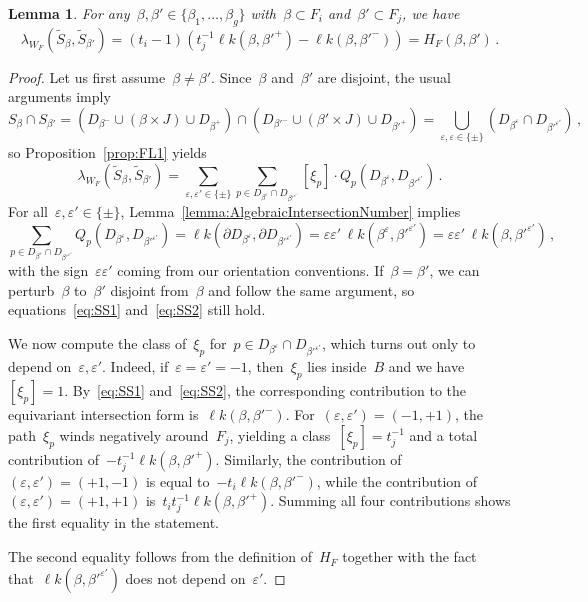 \documentclass[10.9pt,a4paper]{amsart}
\newtheorem{lemma}[theorem]{Lemma}
\theoremstyle{definition}
\theoremstyle{remark}
\newcommand{\lk}{\ell k}
\begin{document}
\begin{lemma}
\label{lemma:IntSS}
For any~$\beta,\beta'\in\{\beta_1,\dots,\beta_g\}$ with~$\beta\subset F_i$ and~$\beta'\subset F_j$, we have
\[
\lambda_{W_F}(\tilde S_{\beta},\tilde S_{\beta'}) = (t_{i}-1) (t_{j}^{-1} \lk(\beta, \beta'^+) - \lk(\beta, \beta'^-)) = H_F(\beta,\beta')\,.
\]
\end{lemma}

\begin{proof}
Let us first assume~$\beta\neq\beta'$. Since~$\beta$ and~$\beta'$ are disjoint, the usual arguments imply
\[
S_{\beta} \cap S_{\beta'} = (D_{\beta^-} \cup (\beta \times J) \cup D_{\beta^+}) \cap (D_{\beta'^-} \cup (\beta' \times J) \cup D_{\beta'^+})=\bigcup_{\varepsilon,\varepsilon\in\{\pm\}}(D_{\beta^\varepsilon}\cap D_{\beta'^{\varepsilon'}})\,,
\]
so Proposition~\ref{prop:FL1} yields
\begin{equation}
\label{eq:SS1}
\lambda_{W_F}(\tilde S_{\beta},\tilde S_{\beta'}) = \sum_{\varepsilon, \varepsilon'\in\{\pm\}} \sum_{p\in D_{\beta^\varepsilon} \cap D_{\beta'^{\varepsilon'}}} [\xi_p]\cdot Q_p(D_{\beta^\varepsilon}, D_{\beta'^{\varepsilon'}})\,.
\end{equation}
For all~$\varepsilon,\varepsilon'\in\{\pm\}$, Lemma~\ref{lemma:AlgebraicIntersectionNumber} implies
\begin{equation}
\label{eq:SS2}
\sum_{p\in D_{\beta^\varepsilon}\cap D_{\beta'^{\varepsilon'}}} Q_p(D_{\beta^\varepsilon}, D_{\beta'^{\varepsilon'}})=\lk(\partial D_{\beta^\varepsilon},\partial D_{\beta'^{\varepsilon'}}) = \varepsilon\varepsilon'\, \lk(\beta^\varepsilon, \beta'^{\varepsilon'})= \varepsilon\varepsilon'\, \lk(\beta, \beta'^{\varepsilon'})\,,
\end{equation}
with the sign~$\varepsilon\varepsilon'$ coming from our orientation conventions.
If~$\beta=\beta'$, we can perturb~$\beta$ to~$\beta'$ disjoint from~$\beta$ and follow the same argument,
so equations~\eqref{eq:SS1} and~\eqref{eq:SS2} still hold.

We now compute the class of~$\xi_p$ for~$p\in D_{\beta^\varepsilon}\cap D_{\beta'^{\varepsilon'}}$, which turns out only to depend on~$\varepsilon,\varepsilon'$. Indeed, if~$\varepsilon=\varepsilon'=-1$, then~$\xi_p$ lies inside~$B$
and we have~$[\xi_p]=1$. By~\eqref{eq:SS1} and~\eqref{eq:SS2}, the corresponding contribution to the equivariant intersection form is~$\lk(\beta,\beta'^-)$.
For~$(\varepsilon,\varepsilon')=(-1,+1)$, the path~$\xi_p$ winds negatively around~$F_{j}$,
yielding a class~$[\xi_p]=t^{-1}_j$ and a total contribution of~$-t_{j}^{-1} \lk(\beta, \beta'^+)$.
Similarly, the contribution of~$(\varepsilon,\varepsilon')=(+1,-1)$ is equal to~$-t_{i} \lk(\beta, \beta'^-)$, while
the contribution of~$(\varepsilon,\varepsilon')=(+1,+1)$ is~$t_{i} t_{j}^{-1} \lk(\beta, \beta'^+)$.
Summing all four contributions shows the first equality in the statement.

The second equality follows from the definition of~$H_F$ together with the fact that~$\lk(\beta,\beta'^{\varepsilon'})$ does not depend on~$\varepsilon'$.
\end{proof}
\end{document}
